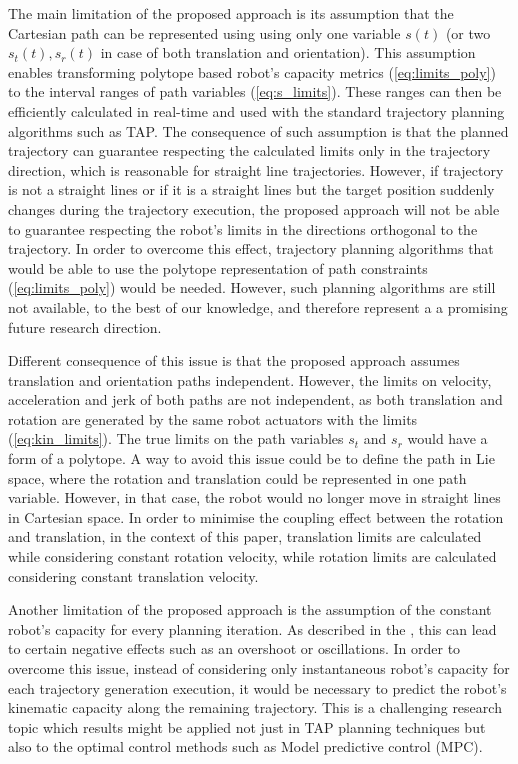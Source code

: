 The main limitation of the proposed approach is its assumption that the Cartesian path can be represented using using only one variable $s(t)$ (or two $s_t(t),s_r(t)$ in case of both translation and orientation). 
This assumption enables transforming polytope based robot's capacity metrics (\ref{eq:limits_poly}) to the interval ranges of path variables (\ref{eq:s_limits}). These ranges can then be efficiently calculated in real-time and used with the standard trajectory planning algorithms such as TAP.  
The consequence of such assumption is that the planned trajectory can guarantee respecting the calculated limits only in the trajectory direction, which is reasonable for straight line trajectories. However, if trajectory is not a straight lines or if it is a straight lines but the target position suddenly changes during the trajectory execution, the proposed approach will not be able to guarantee respecting the robot's limits in the directions orthogonal to the trajectory. In order to overcome this effect, trajectory planning algorithms that would be able to use the polytope representation of path constraints (\ref{eq:limits_poly}) would be needed. However, such planning algorithms are still not available, to the best of our knowledge, and therefore represent a a promising future research direction.

Different consequence of this issue is that the proposed approach assumes translation and orientation paths independent. However, the limits on velocity, acceleration and jerk of both paths are not independent, as both translation and rotation are generated by the same robot actuators with the limits (\ref{eq:kin_limits}). The true limits on the path variables $s_t$ and $s_r$ would have a form of a polytope. A way to avoid this issue could be to define the path in Lie space, where the rotation and translation could be represented in one path variable. However, in that case, the robot would no longer move in straight lines in Cartesian space. In order to minimise the coupling effect between the rotation and translation, in the context of this paper, translation limits are calculated while considering constant rotation velocity, while rotation limits are calculated considering constant translation velocity. 

Another limitation of the proposed approach is the assumption of the constant robot's capacity for every planning iteration. As described in the , this can lead to certain negative effects such as an overshoot or oscillations.  In order to overcome this issue, instead of considering only instantaneous robot's capacity for each trajectory generation execution, it would be necessary to predict the robot's kinematic capacity along the remaining trajectory. This is a challenging research topic which results might be applied not just in TAP planning techniques but also to the optimal control methods such as Model predictive control (MPC).  

